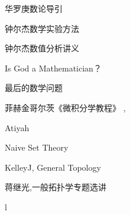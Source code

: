 \documentclass[main.tex]{subfiles}
\begin{document}
华罗庚数论导引
\cite[p.~1]{HuaL}

钟尔杰数学实验方法 \cite{ZhongEr1}

钟尔杰数值分析讲义 \cite{ZhongEr2}

Is God a Mathematician？\cite{LivioM}

最后的数学问题 \cite{LivioM2}

菲赫金哥尔茨《微积分学教程》\cite{FeiH1}
\cite{FeiH2}, \cite{FeiH3}

Atiyah \cite{AM69}

Naive Set Theory \cite{HalmosP}

KelleyJ, General Topology \cite{KelleyJ}
	
蒋继光,一般拓扑学专题选讲\cite{JiangJi}

l
\end{document}
